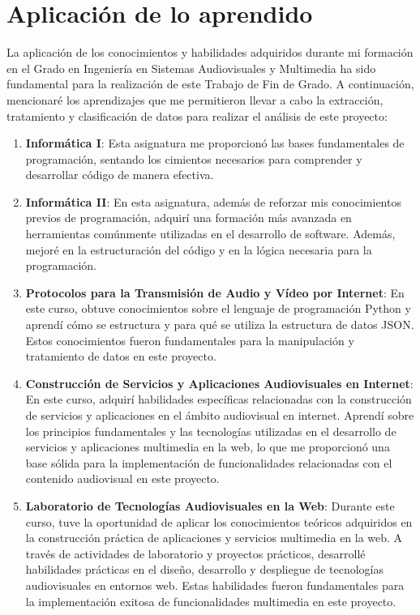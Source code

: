 \documentclass[a4paper, 12pt]{book}
\begin{document}
\section{Aplicación de lo aprendido}
\label{sec:aplicacion}

La aplicación de los conocimientos y habilidades adquiridos durante mi formación en el Grado en Ingeniería en Sistemas Audiovisuales y Multimedia ha sido fundamental para la realización de este Trabajo de Fin de Grado. A continuación, mencionaré los aprendizajes que me permitieron llevar a cabo la extracción, tratamiento y clasificación de datos para realizar el análisis de este proyecto:

\begin{enumerate}
  \item \textbf{Informática I}: Esta asignatura me proporcionó las bases fundamentales de programación, sentando los cimientos necesarios para comprender y desarrollar código de manera efectiva.
  \item \textbf{Informática II}: En esta asignatura, además de reforzar mis conocimientos previos de programación, adquirí una formación más avanzada en herramientas comúnmente utilizadas en el desarrollo de software. Además, mejoré en la estructuración del código y en la lógica necesaria para la programación.
  \item \textbf{Protocolos para la Transmisión de Audio y Vídeo por Internet}: En este curso, obtuve conocimientos sobre el lenguaje de programación Python y aprendí cómo se estructura y para qué se utiliza la estructura de datos JSON. Estos conocimientos fueron fundamentales para la manipulación y tratamiento de datos en este proyecto.
  \item \textbf{Construcción de Servicios y Aplicaciones Audiovisuales en Internet}: En este curso, adquirí habilidades específicas relacionadas con la construcción de servicios y aplicaciones en el ámbito audiovisual en internet. Aprendí sobre los principios fundamentales y las tecnologías utilizadas en el desarrollo de servicios y aplicaciones multimedia en la web, lo que me proporcionó una base sólida para la implementación de funcionalidades relacionadas con el contenido audiovisual en este proyecto.
  \item \textbf{Laboratorio de Tecnologías Audiovisuales en la Web}: Durante este curso, tuve la oportunidad de aplicar los conocimientos teóricos adquiridos en la construcción práctica de aplicaciones y servicios multimedia en la web. A través de actividades de laboratorio y proyectos prácticos, desarrollé habilidades prácticas en el diseño, desarrollo y despliegue de tecnologías audiovisuales en entornos web. Estas habilidades fueron fundamentales para la implementación exitosa de funcionalidades multimedia en este proyecto.
\end{enumerate}
\end{document}
